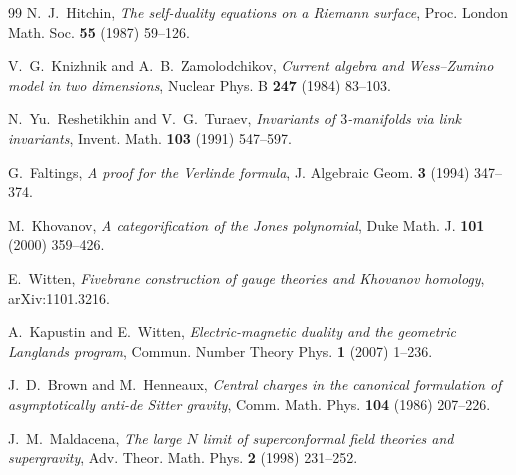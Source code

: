 \begin{thebibliography}{99}
 N.~J.~Hitchin, \emph{The self-duality equations on a Riemann surface},
Proc. London Math. Soc. \textbf{55} (1987) 59--126.

 V.~G.~Knizhnik and A.~B.~Zamolodchikov,
\emph{Current algebra and Wess--Zumino model in two dimensions},
Nuclear Phys. B \textbf{247} (1984) 83--103.

 N.~Yu.~Reshetikhin and V.~G.~Turaev, \emph{Invariants of $3$-manifolds via
link invariants}, Invent. Math. \textbf{103} (1991) 547--597.

 G.~Faltings, \emph{A proof for the Verlinde formula},
J. Algebraic Geom. \textbf{3} (1994) 347--374.

 M.~Khovanov, \emph{A categorification of the Jones polynomial},
Duke Math. J. \textbf{101} (2000) 359--426.

 E.~Witten, \emph{Fivebrane construction of gauge theories and
Khovanov homology}, arXiv:1101.3216.

 A.~Kapustin and E.~Witten, \emph{Electric-magnetic duality and the
geometric Langlands program}, Commun. Number Theory Phys. \textbf{1} (2007) 1--236.

 J.~D.~Brown and M.~Henneaux, \emph{Central charges in the canonical
formulation of asymptotically anti-de Sitter gravity}, Comm. Math. Phys. \textbf{104} (1986) 207--226.

 J.~M.~Maldacena, \emph{The large $N$ limit of superconformal field
theories and supergravity}, Adv. Theor. Math. Phys. \textbf{2} (1998) 231--252.

\end{thebibliography}
